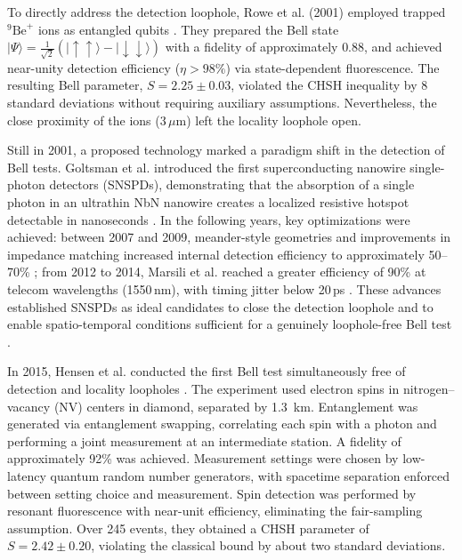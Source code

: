 \documentclass[aps,pra,reprint, superscriptaddress,showkeys]{revtex4-2}
\theoremstyle{plain}
\begin{document}
To directly address the detection loophole, Rowe et al. (2001) employed trapped $^9\text{Be}^+$ ions as entangled qubits \cite{Rowe2001}. They prepared the Bell state $|\Psi\rangle = \frac{1}{\sqrt{2}} (|\uparrow\uparrow\rangle - |\downarrow\downarrow\rangle)$ with a fidelity of approximately $0.88$, and achieved near-unity detection efficiency ($\eta > 98\%$) via state-dependent fluorescence. The resulting Bell parameter, $S = 2.25 \pm 0.03$, violated the CHSH inequality by 8 standard deviations without requiring auxiliary assumptions.  Nevertheless, the close proximity of the ions (3\,$\mu$m) left the locality loophole open.

Still in 2001, a proposed technology marked a paradigm shift in the detection of Bell tests. Goltsman et al. introduced the first superconducting nanowire single-photon detectors (SNSPDs), demonstrating that the absorption of a single photon in an ultrathin NbN nanowire creates a localized resistive hotspot detectable in nanoseconds \cite{Goltsman2001}. In the following years, key optimizations were achieved: between 2007 and 2009, meander-style geometries and improvements in impedance matching increased internal detection efficiency to approximately 50--70\% \cite{Kerman2007, Anant2008}; from 2012 to 2014, Marsili et al. reached a greater efficiency of 90\% at telecom wavelengths (1550\,nm), with timing jitter below 20\,ps \cite{Marsili2013}. These advances established SNSPDs as ideal candidates to close the detection loophole and to enable spatio-temporal conditions sufficient for a genuinely loophole-free Bell test \cite{Christensen2013}.

In 2015, Hensen et al. conducted the first Bell test simultaneously free of detection and locality loopholes \cite{Hensen2015}. The experiment used electron spins in nitrogen–vacancy (NV) centers in diamond, separated by 1.3~km. Entanglement was generated via entanglement swapping, correlating each spin with a photon and performing a joint measurement at an intermediate station. A fidelity of approximately 92\% was achieved. Measurement settings were chosen by low-latency quantum random number generators, with spacetime separation enforced between setting choice and measurement. Spin detection was performed by resonant fluorescence with near-unit efficiency, eliminating the fair-sampling assumption. Over 245 events, they obtained a CHSH parameter of $S = 2.42 \pm 0.20$, violating the classical bound by about two standard deviations.
\end{document}
